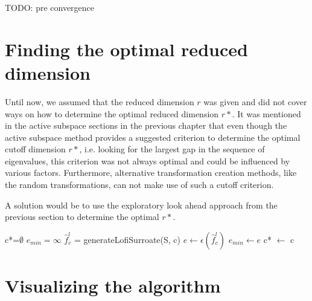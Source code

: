 \documentclass[
  a4paper,  %
  twoside,  %
  bibliography=totoc,
  headsepline,
  cleardoublepage=empty,
  parskip=half,
  draft=false
]{scrbook}
\begin{document}
TODO: pre convergence

\section{Finding the optimal reduced dimension}

Until now, we assumed that the reduced dimension $r$ was given and did not cover ways on how to determine the optimal reduced dimension $r*$.
It was mentioned in the active subspace sections in the previous chapter that even though the active subspace method provides a suggested criterion to determine the optimal cutoff dimension $r*$, i.e. looking for the largest gap in the sequence of eigenvalues, this criterion was not always optimal and could be influenced by various factors.
Furthermore, alternative transformation creation methods, like the random transformations, can not make use of such a cutoff criterion.

A solution would be to use the exploratory look ahead approach from the previous section to determine the optimal $r*$.

\begin{algorithm}[H]
\normalsize
\begin{algorithmic}
    \State c*=$\emptyset$
    \State $e_{min}=\infty$
      \State $\hat{f}_c^l$ = generateLofiSurroate(S, c)
    	\State $e \gets \epsilon(\hat{f}_c^l)$
    	  \State $e_{min}\gets e$
    	\State c* $\gets$ c
    	\EndIf
    \EndFor
    \State {}
\EndFunction
\end{algorithmic}
\end{algorithm}

\newpage
\section{Visualizing the algorithm}
\end{document}
